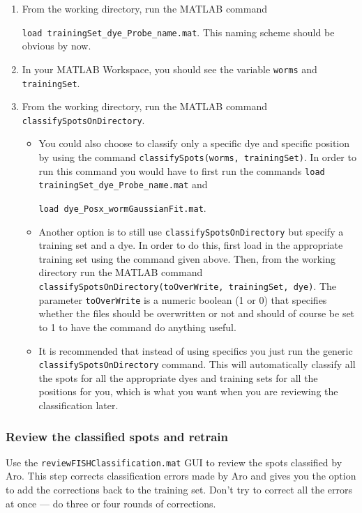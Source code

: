 \documentclass[titlepage,11pt]{article}
\begin{document}
\begin{enumerate}
\item From the working directory, run the MATLAB command 

\texttt{load trainingSet\_dye\_Probe\_name.mat}. This naming scheme should be obvious by now.
\item In your MATLAB Workspace, you should see the variable \texttt{worms} and \texttt{trainingSet}.
\item From the working directory, run the MATLAB command
\texttt{classifySpotsOnDirectory}.
\begin{itemize}
\item You could also choose to classify only a specific dye and specific position by using the command 
\texttt{classifySpots(worms, trainingSet)}. In order to run this command you would have to first run the commands
\texttt{load trainingSet\_dye\_Probe\_name.mat} and
 
\texttt{load dye\_Posx\_wormGaussianFit.mat}.
\item Another option is to still use \texttt{classifySpotsOnDirectory} but specify a training set and a dye. In order to do this, first load in the appropriate training set using the command given above. Then, from the working directory run the MATLAB command
\texttt{classifySpotsOnDirectory(toOverWrite, trainingSet, dye)}. The parameter \texttt{toOverWrite} is a numeric boolean (1 or 0) that specifies whether the files should be overwritten or not and should of course be set to 1 to have the command do anything useful.
\item It is recommended that instead of using specifics you just run the generic 
\texttt{classifySpotsOnDirectory} command. This will automatically classify all the spots for all the appropriate dyes and training sets for all the positions for you, which is what you want when you are reviewing the classification later.
\end{itemize}
\end{enumerate}

\subsubsection{Review the classified spots and retrain}
Use the \texttt{reviewFISHClassification.mat} GUI to review the spots classified by Aro. This step corrects classification errors made by Aro and gives you the option to add the corrections back to the training set. Don't try to correct all the errors at once --- do three or four rounds of corrections.\\
\end{document}
